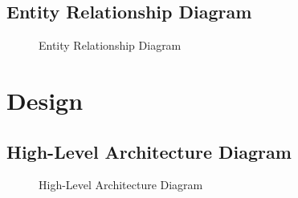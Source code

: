 \documentclass[a4paper]{article}
\begin{document}
\begin{landscape}
\clearpage
\subsection{Entity Relationship Diagram}
\begin{figure}[!ht] %
    \centering{} %
    \caption{Entity Relationship Diagram}
    \label{fig:erd}
\end{figure}
\end{landscape}

\section{Design}
\subsection{High-Level Architecture Diagram}
\begin{figure}[!ht] %
    \centering{} %
    \caption{High-Level Architecture Diagram}
    \label{fig:arch}
\end{figure}
\end{document}
